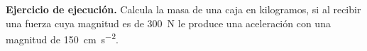 \documentclass[12pt, letter]{exam}
\begin{document}
\begin{questions}


    \question \label{Ejercicio_09} \textbf{Ejercicio de ejecución. } Calcula la masa de una caja en kilogramos, si al recibir una fuerza cuya magnitud es de \SI{300}{\newton} le produce una aceleración con una magnitud de \SI{150}{\centi\meter\per\square\second}.

\end{questions}
\end{document}
